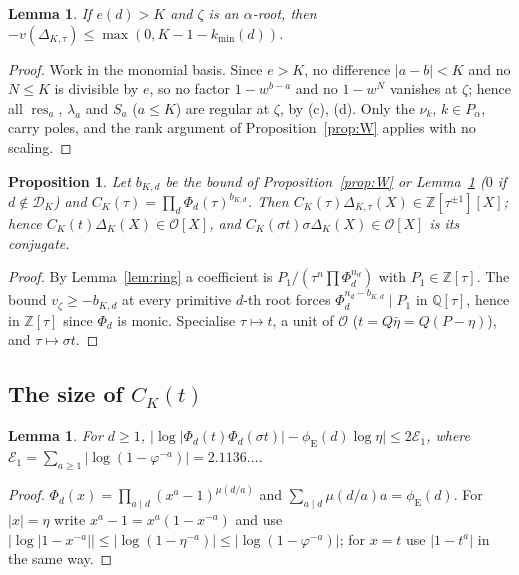 \documentclass[11pt]{amsart}
\newtheorem{proposition}[theorem]{Proposition}
\newtheorem{lemma}[theorem]{Lemma}
\theoremstyle{definition}
\theoremstyle{remark}
\numberwithin{equation}{section}
\newcommand{\ZZ}{\mathbb{Z}}
\newcommand{\QQ}{\mathbb{Q}}
\newcommand{\cO}{\mathcal{O}}
\newcommand{\cD}{\mathcal{D}}
\newcommand{\eu}{\phi_{\mathrm E}}
\newcommand{\Res}{\operatorname{res}}
\begin{document}
\begin{lemma}\label{lem:alpha}
If $e(d)>K$ and $\zeta$ is an $\alpha$-root, then $-v(\Delta_{K,\tau})\le\max(0,K-1-k_{\min}(d))$.
\end{lemma}
\begin{proof}
Work in the monomial basis. Since $e>K$, no difference $|a-b|<K$ and no $N\le K$ is divisible by $e$, so no factor
$1-w^{b-a}$ and no $1-w^N$ vanishes at $\zeta$; hence all $\Res_a$, $\lambda_a$ and $S_a$ ($a\le K$) are regular at
$\zeta$, by (c), (d). Only the $\nu_k$, $k\in P_\alpha$, carry poles, and the rank argument of Proposition~\ref{prop:W}
applies with no scaling.
\end{proof}

\begin{proposition}\label{prop:global}
Let $b_{K,d}$ be the bound of Proposition~\ref{prop:W} or Lemma~\ref{lem:alpha} \textup{(}$0$ if $d\notin\cD_K$\textup{)}
and $C_K(\tau)=\prod_d\Phi_d(\tau)^{b_{K,d}}$. Then $C_K(\tau)\Delta_{K,\tau}(X)\in\ZZ[\tau^{\pm1}][X]$; hence
$C_K(t)\Delta_K(X)\in\cO[X]$, and $C_K(\sigma t)\sigma\Delta_K(X)\in\cO[X]$ is its conjugate.
\end{proposition}
\begin{proof}
By Lemma~\ref{lem:ring} a coefficient is $P_1/(\tau^n\prod\Phi_d^{n_d})$ with $P_1\in\ZZ[\tau]$. The bound
$v_\zeta\ge-b_{K,d}$ at every primitive $d$-th root forces $\Phi_d^{n_d-b_{K,d}}\mid P_1$ in $\QQ[\tau]$, hence in
$\ZZ[\tau]$ since $\Phi_d$ is monic. Specialise $\tau\mapsto t$, a unit of $\cO$ ($t=Q\bar\eta=Q(P-\eta)$), and
$\tau\mapsto\sigma t$.
\end{proof}

\subsection{\texorpdfstring{The size of $C_K(t)$}{The size of C\_K(t)}}

\begin{lemma}\label{lem:phid}
For $d\ge1$, $\bigl|\log|\Phi_d(t)\Phi_d(\sigma t)|-\eu(d)\log\eta\bigr|\le2\mathcal E_1$, where
$\mathcal E_1=\sum_{a\ge1}|\log(1-\varphi^{-a})|=2.1136\ldots$.
\end{lemma}
\begin{proof}
$\Phi_d(x)=\prod_{a\mid d}(x^a-1)^{\mu(d/a)}$ and $\sum_{a\mid d}\mu(d/a)a=\eu(d)$. For $|x|=\eta$ write
$x^a-1=x^a(1-x^{-a})$ and use $|\log|1-x^{-a}||\le|\log(1-\eta^{-a})|\le|\log(1-\varphi^{-a})|$; for $x=t$ use
$|1-t^a|$ in the same way.
\end{proof}
\end{document}
